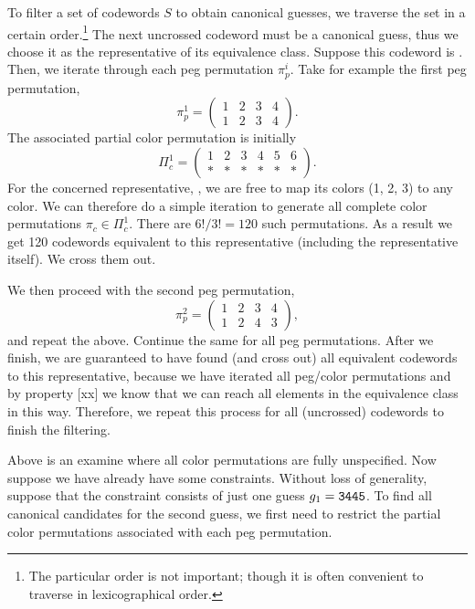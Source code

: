 To filter a set of codewords $S$ to obtain canonical guesses, we traverse the set in a certain order.\footnote{The particular order is not important; though it is often convenient to traverse in lexicographical order.} 
The next uncrossed codeword must be a canonical guess, thus we choose it as the representative of its equivalence class. Suppose this codeword is . Then, we iterate through each peg permutation $\pi_p^i$. Take for example the first peg permutation,
\[
\pi_p^1 = 
\begin{pmatrix}
1 & 2 & 3 & 4 \\
1 & 2 & 3 & 4
\end{pmatrix} .
\]
The associated partial color permutation is initially
\[
\Pi_c^1 = 
\begin{pmatrix}
1 & 2 & 3 & 4 & 5 & 6 \\
* & * & * & * & * & * 
\end{pmatrix} .
\]
For the concerned representative, , we are free to map its colors (1, 2, 3) to any color. We can therefore do a simple iteration to generate all complete color permutations $\pi_c \in \Pi_c^1$. There are $6! / 3! = 120$ such permutations. As a result we get 120 codewords equivalent to this representative (including the representative itself). We cross them out.

We then proceed with the second peg permutation,
\[
\pi_p^2 = 
\begin{pmatrix}
1 & 2 & 3 & 4 \\
1 & 2 & 4 & 3
\end{pmatrix} ,
\] 
and repeat the above. Continue the same for all peg permutations. After we finish, we are guaranteed to have found (and cross out) all equivalent codewords to this representative, because we have iterated all peg/color permutations and by property [xx] we know that we can reach all elements in the equivalence class in this way. Therefore, we repeat this process for all (uncrossed) codewords to finish the filtering.

Above is an examine where all color permutations are fully unspecified. Now suppose we have already have some constraints. Without loss of generality, suppose that the constraint consists of just one guess $g_1 = \texttt{3445}$. To find all canonical candidates for the second guess, we first need to restrict the partial color permutations associated with each peg permutation. 

